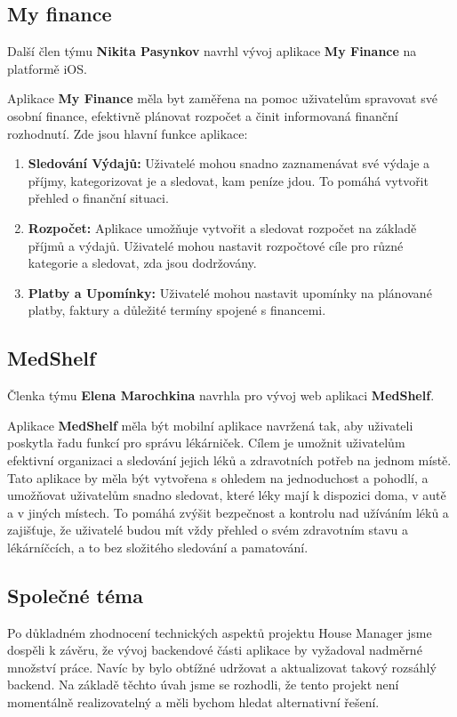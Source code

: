 \documentclass[a4paper, 11pt]{article}
\begin{document}
 \subsection{My finance}
Další člen týmu \textbf{Nikita Pasynkov} navrhl vývoj aplikace \textbf{My Finance} na platformě iOS.

Aplikace \textbf{My Finance} měla byt zaměřena na pomoc uživatelům spravovat své osobní finance, efektivně plánovat rozpočet a činit informovaná finanční rozhodnutí.
Zde jsou hlavní funkce aplikace:

\begin{enumerate}
    \item \textbf{Sledování Výdajů:} Uživatelé mohou snadno zaznamenávat své výdaje a příjmy, kategorizovat je a sledovat, kam peníze jdou. To pomáhá vytvořit přehled o finanční situaci.
    \item \textbf{Rozpočet:} Aplikace umožňuje vytvořit a sledovat rozpočet na základě příjmů a výdajů. Uživatelé mohou nastavit rozpočtové cíle pro různé kategorie a sledovat, zda jsou dodržovány.
    \item \textbf{Platby a Upomínky:} Uživatelé mohou nastavit upomínky na plánované platby, faktury a důležité termíny spojené s financemi.
\end{enumerate}

\subsection{MedShelf}
 Členka týmu \textbf{Elena Marochkina} navrhla pro vývoj web aplikaci \textbf{MedShelf}.

 Aplikace \textbf{MedShelf} měla být mobilní aplikace navržená tak, aby uživateli poskytla řadu funkcí pro správu lékárniček. Cílem je umožnit uživatelům efektivní organizaci a sledování jejich léků a zdravotních potřeb na jednom místě. Tato aplikace by měla být vytvořena s ohledem na jednoduchost a pohodlí, a umožňovat uživatelům snadno sledovat, které léky mají k dispozici doma, v autě a v jiných místech. To pomáhá zvýšit bezpečnost a kontrolu nad užíváním léků a zajišťuje, že uživatelé budou mít vždy přehled o svém zdravotním stavu a lékárníčcích, a to bez složitého sledování a pamatování.

\subsection{Společné téma}
Po důkladném zhodnocení technických aspektů projektu House Manager jsme dospěli k závěru, že vývoj backendové části aplikace by vyžadoval nadměrné množství práce. Navíc by bylo obtížné udržovat a aktualizovat takový rozsáhlý backend. Na základě těchto úvah jsme se rozhodli, že tento projekt není momentálně realizovatelný a měli bychom hledat alternativní řešení.
\end{document}
